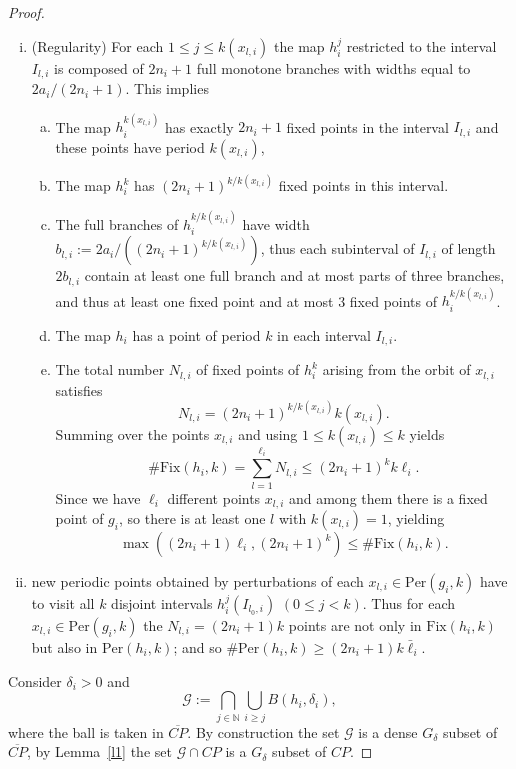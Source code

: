 \documentclass[12pt, a4paper]{amsart}
\def\N{{\mathbb N}}
\def\le{\leqslant}
\def\ge{\geqslant}
\def\per{\mathrm{Per}}
\newcommand{\?}{{\bf ???}}
\def\CP{\overline{CP}}
\newcommand{\fix}{\mathrm{Fix}}
\begin{document}
\begin{proof}
\begin{enumerate}[i)]
\item \label{p2}   (Regularity) For each $1 \le j \le k(x_{l,i})$ the map
$h^j_i$ restricted to the interval $I_{l,i}$ is composed of $2n_i+1$ full monotone branches
with widths equal to $2a_i/(2n_i + 1)$. This implies
\begin{enumerate}[a)]
\item \label{p2a}
 The map $h_i^{k(x_{l,i})}$  has exactly  $2n_i + 1$ fixed points
in the interval  $I_{l,i}$ and these points have period $k(x_{l,i})$,
\item \label{p2b} The map $h_i^k$ has
 $(2n_i+1)^{k/k(x_{l,i})}$ fixed points in this interval.
 \item \label{p2c}  The full branches of $h_i^{k/k(x_{l,i})}$ have width $b_{l,i} := 2a_i/((2n_i+1)^{k/k(x_{l,i})})$, thus
each subinterval of $I_{l,i}$ of length $2b_{l,i}$ contain at least one full branch and at most parts of three branches,  and thus at least one fixed point and at most 3 fixed points of $h_i^{k/k(x_{l,i})}$.
 \item\label{p2d}  The map $h_i$ has a point of period $k$ in each interval $I_{l,i}$.


 \item \label{p2e} The total number $N_{l,i}$ of fixed points of $h_i^k$ arising from the orbit of $x_{l,i}$  satisfies
$$ N_{l,i}   =  (2n_i + 1)^{k/k(x_{l,i})} k(x_{l,i}).$$
Summing over the points $x_{l,i}$  and using $1 \le k(x_{l,i}) \le k$ yields
$$\#  \fix(h_i,k) = \sum_{l=1}^{\ell_i} N_{l,i}   \le (2n_i + 1)^{k} k \ell_i.$$
Since we have $\ell_i$ different points $x_{l,i}$ and among them there is a fixed point of $g_i$, so there is at least one $l$ with $k(x_{l,i})=1$, yielding
$$\max( (2n_i + 1) \ell_i ,  (2n_i + 1)^k)
 \le \#  \fix(h_i,k).$$
 \end{enumerate}
\item new periodic points obtained by perturbations of each $x_{l,i} \in \per(g_i,k)$ have to
visit all $k$ disjoint intervals $h_i^j (I_{l_0,i})$  $(0 \le j < k)$.
Thus for each $x_{l,i} \in \per(g_i,k)$ the $N_{l,i} = (2n_i + 1)k$ points are
not only in $\fix(h_i,k)$ but also in  $\per(h_i,k)$; and so
 $\# \per(h_i,k) \ge (2n_i + 1)k \bar \ell_i$. 
\end{enumerate}



Consider $\delta_i > 0$ and
 $$\mathcal{G}:= \bigcap_{j \in\N} \bigcup_{i \ge j} B(h_i ,\delta_i),$$
 where the ball is taken in $\CP$.
 By construction the set $\mathcal{G}$ is a dense $G_{\delta}$ subset of $\CP$,  by Lemma~\ref{l1} the set $\mathcal{G} \cap CP$ is a $G_\delta$ subset of $CP$.
 

\end{proof}
\end{document}
